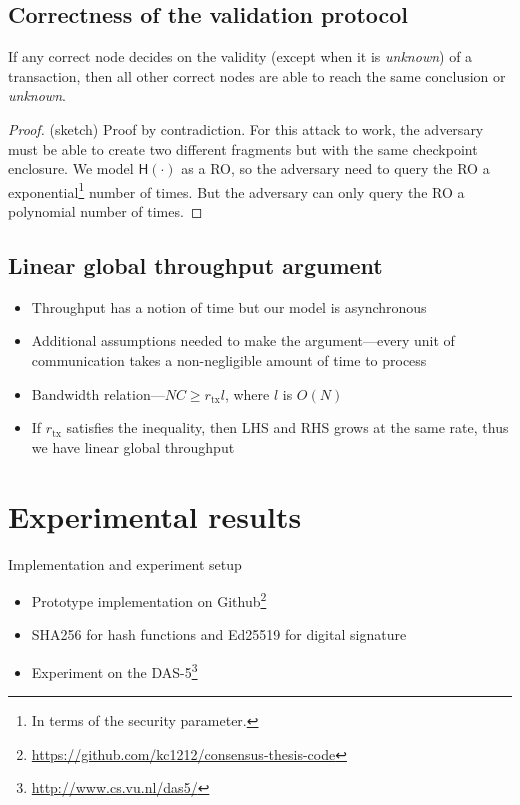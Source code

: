 \documentclass{beamer}
\begin{document}
\subsection{Correctness of the validation protocol}
\begin{frame}{\subsecname}
\begin{theorem}
If any correct node decides on the validity (except when it is \emph{unknown}) of a transaction,
then all other correct nodes are able to reach the same conclusion or \emph{unknown}.
\end{theorem}
\begin{proof}(sketch)
Proof by contradiction.
For this attack to work, the adversary must be able to create two different fragments but with the same checkpoint enclosure.
We model $\textsf{H}(\cdot)$ as a RO, so the adversary need to query the RO a exponential\footnote{In terms of the security parameter.} number of times.
But the adversary can only query the RO a polynomial number of times.
\end{proof}
\end{frame}

\subsection{Linear global throughput argument}
\begin{frame}{\subsecname}
\begin{itemize}
  \item Throughput has a notion of time but our model is asynchronous
  \item Additional assumptions needed to make the argument---every unit of communication takes a non-negligible amount of time to process
  \item Bandwidth relation---$NC \ge r_{\text{tx}} l$, where $l$ is $O(N)$
  \item If $r_\text{tx}$ satisfies the inequality, then LHS and RHS grows at the same rate,
  thus we have linear global throughput
\end{itemize}
\end{frame}

\section{Experimental results}
\begin{frame}{Implementation and experiment setup}
  \begin{itemize}
    \item Prototype implementation on Github\footnote{\url{https://github.com/kc1212/consensus-thesis-code}}
    \item SHA256 for hash functions and Ed25519 for digital signature
    \item Experiment on the DAS-5\footnote{\url{http://www.cs.vu.nl/das5/}}
  \end{itemize}
\end{frame}
\end{document}
